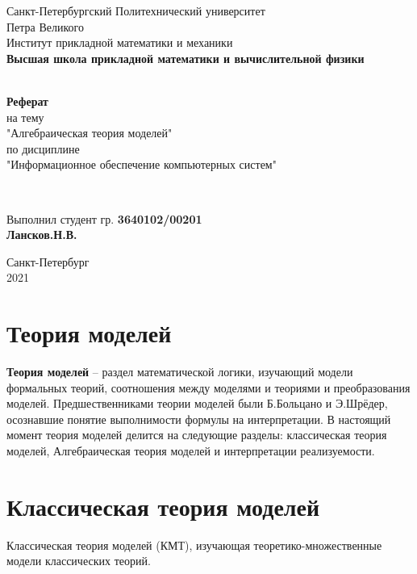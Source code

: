 \documentclass[12pt, a4paper]{article}
\begin{document}
\begin{titlepage}
	\center
		Санкт-Петербургский Политехнический
		университет \\ Петра Великого\\
		Институт прикладной математики и механики
		\\ \textbf{Высшая школа прикладной математики и вычислительной физики}

	\vfill ~
	\textbf{
		\\ \large Реферат
	}
	\\	на тему
	\\ "Алгебраическая теория моделей"
	\\ по дисциплине
	\\ "Информационное обеспечение компьютерных систем"

	\vfill ~

	Выполнил студент гр. \textbf{3640102/00201} \\
	\textbf{Лансков.Н.В.} \\

\vfill

{\large}	Санкт-Петербург
\\ 2021
\end{titlepage}

\section{Теория моделей}

\textbf{Теория моделей} – раздел математической логики, изучающий модели формальных теорий,
соотношения между моделями и теориями и преобразования моделей. Предшественниками теории
моделей были Б.Больцано и Э.Шрёдер, осознавшие понятие выполнимости формулы на
интерпретации. В настоящий момент теория моделей делится на следующие разделы: классическая теория моделей, Алгебраическая теория моделей и интерпретации реализуемости.

\section{Классическая теория моделей}

Классическая теория моделей (КМТ), изучающая теоретико-множественные модели классических теорий.
\end{document}
